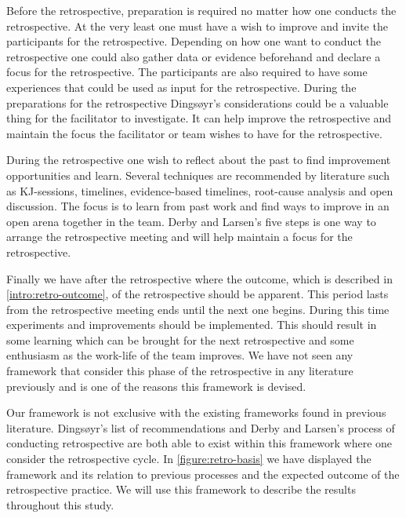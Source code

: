 Before the retrospective, preparation is required no matter how one conducts the retrospective. At the very least one must have a wish to improve and invite the participants for the retrospective. Depending on how one want to conduct the retrospective one could also gather data or evidence beforehand and declare a focus for the retrospective. The participants are also required to have some experiences that could be used as input for the retrospective. During the preparations for the retrospective Dingsøyr's considerations could be a valuable thing for the facilitator to investigate. It can help improve the retrospective and maintain the focus the facilitator or team wishes to have for the retrospective. 

During the retrospective one wish to reflect about the past to find improvement opportunities and learn. Several techniques are recommended by literature such as KJ-sessions, timelines, evidence-based timelines, root-cause analysis and open discussion. The focus is to learn from past work and find ways to improve in an open arena together in the team. Derby and Larsen's five steps is one way to arrange the retrospective meeting and will help maintain a focus for the retrospective. 

Finally we have after the retrospective where the outcome, which is described in \autoref{intro:retro-outcome}, of the retrospective should be apparent. This period lasts from the retrospective meeting ends until the next one begins. During this time experiments and improvements should be implemented. This should result in some learning which can be brought for the next retrospective and some enthusiasm as the work-life of the team improves. We have not seen any framework that consider this phase of the retrospective in any literature previously and is one of the reasons this framework is devised. 

Our framework is not exclusive with the existing frameworks found in previous literature. Dingsøyr's list of recommendations and Derby and Larsen's process of conducting retrospective are both able to exist within this framework where one consider the retrospective cycle. In \autoref{figure:retro-basis} we have displayed the framework and its relation to previous processes and the expected outcome of the retrospective practice. We will use this framework to describe the results throughout this study.

